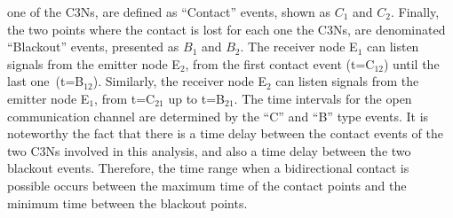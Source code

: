 \documentclass[crop]{CSLB}
\newcommand{\cetis}{C3Ns}
\begin{document}
one of the \cetis{}, are defined as ``Contact'' events, shown as $C_1$
and $C_2$.
%
Finally, the two points where the contact is lost for each one the
\cetis{}, are denominated ``Blackout'' events, presented as $B_1$ and
$B_2$.
%
The receiver node E$_1$ can listen signals from the emitter node
E$_2$, from the first contact event (t=C$_{12}$) until the last
one (t=B$_{12}$).
%
Similarly, the receiver node E$_2$ can listen signals from the emitter
node E$_1$, from t=C$_{21}$ up to t=B$_{21}$.
%
The time intervals for the open communication channel are determined
by the ``C'' and ``B'' type events.
%
It is noteworthy the fact that there is a time delay between the
contact events of the two \cetis{} involved in this analysis, and also
a time delay between the two blackout events.
%
Therefore, the time range when a bidirectional contact is possible
occurs between the maximum time of the contact points and the minimum
time between the blackout points.
\end{document}
